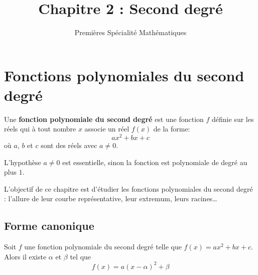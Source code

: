 \documentclass{article}
\title{Chapitre 2 : Second degré}
\date{}
\author{Premières Spécialité Mathématiques}
\begin{document}
\maketitle

\section{Fonctions polynomiales du second degré}

\begin{tcolorbox}
\begin{definition}
Une \textbf{fonction polynomiale du second degré} est une fonction $f$ définie sur les réels qui à tout nombre $x$ associe un réel $f(x)$ de la forme:
\begin{equation*}
ax^2+bx+c   
\end{equation*}
où $a$, $b$ et $c$ sont des réels avec $a \neq 0$. 
\end{definition}
\end{tcolorbox}
\begin{remark}
L'hypothèse $a \neq 0$ est essentielle, sinon la fonction est polynomiale de degré au plus $1$.    
\end{remark}
L'objectif de ce chapitre est d'étudier les fonctions polynomiales du second degré : l'allure de leur courbe représentative, leur extremum, leurs racines\dots
\subsection{Forme canonique}
\begin{tcolorbox}
\begin{proposition}
Soit $f$ une fonction polynomiale du second degré telle que $f(x) = ax^2 + bx + c$. Alors il existe $\alpha$ et $\beta$ tel que
\begin{equation*}
f(x) = a(x - \alpha)^2 + \beta
\end{equation*}
\end{proposition}
\end{tcolorbox}
\emptybox{10cm}
\end{document}
